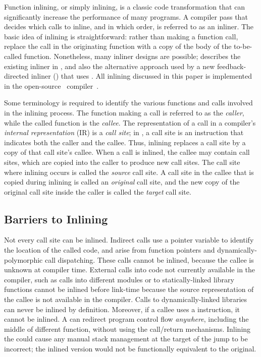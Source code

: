 
Function inlining, or simply inlining, is a classic code transformation that can significantly increase the performance of many programs.  A compiler pass that decides which calls to inline, and in which order, is referred to as an inliner.  The basic idea of inlining is straightforward: rather than making a function call, replace the call in the originating function with a copy of the body of the to-be-called function.  Nonetheless, many inliner designs are possible; \cite{BerubePhD} describes the existing inliner in \llvm, and also the alternative approach used by a new feedback-directed inliner (\FDI) that uses \CP. All inlining discussed in this paper is implemented in the open-source \llvm\ compiler~\cite{LattnerAdveCGO04}.

Some terminology is required to identify the various functions and calls involved in the inlining process.  The function making a call is referred to as the {\it caller}, while the called function is the {\it callee}.  The representation of a call in a compiler's {\it internal representation} (IR) is a {\it call site}; in \llvm, a call site is an instruction that indicates both the caller and the callee.  Thus, inlining replaces a call site by a copy of that call site's callee. When a call is inlined, the callee may contain call sites, which are copied into the caller to produce new call sites.  The call site where inlining occurs is called the {\it source} call site.  A call site in the callee that is copied during inlining is called an {\it original} call site, and the new copy of the original call site inside the caller is called the {\it target} call site.

\subsection{Barriers to Inlining}

Not every call site can be inlined.  Indirect calls use a pointer variable to identify the location of the called code, and arise from function pointers and dynamically-polymorphic call dispatching.  These calls cannot be inlined, because the callee is unknown at compiler time.  External calls into code not currently available in the compiler, such as calls into different modules or to statically-linked library functions cannot be inlined before link-time because the source representation of the callee is not available in the compiler. Calls to dynamically-linked libraries can never be inlined by definition. Moreover, if a callee uses a  instruction, it cannot be inlined. A  can redirect program control flow {\it anywhere}, including the middle of different function, without using the call/return mechanisms.  Inlining the  could cause any manual stack management at the target of the jump to be incorrect; the inlined version would not be functionally equivalent to the original.

